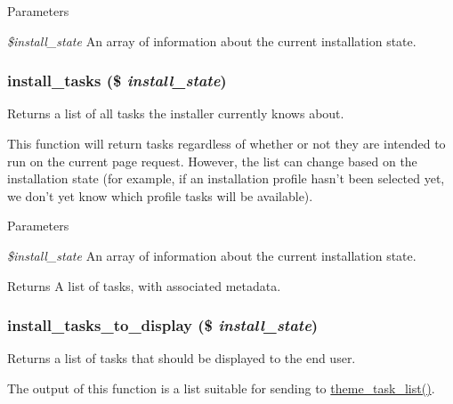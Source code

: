 \begin{DoxyParams}{Parameters}
\item[{\em \$install\_\-state}]An array of information about the current installation state. \end{DoxyParams}
\hypertarget{install_8core_8inc_a243570ad640fab913f1c14cc750d3194}{
\subsubsection[{install\_\-tasks}]{\setlength{\rightskip}{0pt plus 5cm}install\_\-tasks (\$ {\em install\_\-state})}}
\label{install_8core_8inc_a243570ad640fab913f1c14cc750d3194}
Returns a list of all tasks the installer currently knows about.

This function will return tasks regardless of whether or not they are intended to run on the current page request. However, the list can change based on the installation state (for example, if an installation profile hasn't been selected yet, we don't yet know which profile tasks will be available).


\begin{DoxyParams}{Parameters}
\item[{\em \$install\_\-state}]An array of information about the current installation state.\end{DoxyParams}
\begin{DoxyReturn}{Returns}
A list of tasks, with associated metadata. 
\end{DoxyReturn}
\hypertarget{install_8core_8inc_ab265ac63af5ca0c96ab6278be25e6776}{
\subsubsection[{install\_\-tasks\_\-to\_\-display}]{\setlength{\rightskip}{0pt plus 5cm}install\_\-tasks\_\-to\_\-display (\$ {\em install\_\-state})}}
\label{install_8core_8inc_ab265ac63af5ca0c96ab6278be25e6776}
Returns a list of tasks that should be displayed to the end user.

The output of this function is a list suitable for sending to \hyperlink{group__themeable_gacac34ad88b724d01c7ca68f7891f64db}{theme\_\-task\_\-list()}.


